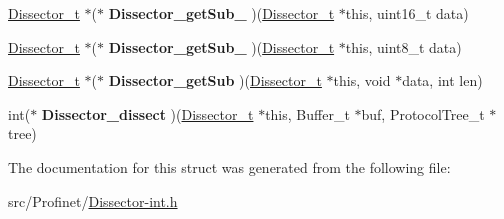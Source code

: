 \begin{DoxyCompactItemize}
\item 
\hypertarget{struct_dissector__ops_acaa1e2ba26e7c3a4f7aa8e35fa35beb9}{}\hyperlink{struct_dissector}{Dissector\+\_\+t} $\ast$($\ast$ {\bfseries Dissector\+\_\+get\+Sub\+\_} )(\hyperlink{struct_dissector}{Dissector\+\_\+t} $\ast$this, uint16\+\_\+t data)\label{struct_dissector__ops_acaa1e2ba26e7c3a4f7aa8e35fa35beb9}

\item 
\hypertarget{struct_dissector__ops_ac821f45c0b8976ed2f0d02ead701ab18}{}\hyperlink{struct_dissector}{Dissector\+\_\+t} $\ast$($\ast$ {\bfseries Dissector\+\_\+get\+Sub\+\_} )(\hyperlink{struct_dissector}{Dissector\+\_\+t} $\ast$this, uint8\+\_\+t data)\label{struct_dissector__ops_ac821f45c0b8976ed2f0d02ead701ab18}

\item 
\hypertarget{struct_dissector__ops_a687bd0733ecbe9b1443fcf846d3acac7}{}\hyperlink{struct_dissector}{Dissector\+\_\+t} $\ast$($\ast$ {\bfseries Dissector\+\_\+get\+Sub} )(\hyperlink{struct_dissector}{Dissector\+\_\+t} $\ast$this, void $\ast$data, int len)\label{struct_dissector__ops_a687bd0733ecbe9b1443fcf846d3acac7}

\item 
\hypertarget{struct_dissector__ops_a6dcacad56d3939148ddd7bca89b7c72b}{}int($\ast$ {\bfseries Dissector\+\_\+dissect} )(\hyperlink{struct_dissector}{Dissector\+\_\+t} $\ast$this, Buffer\+\_\+t $\ast$buf, Protocol\+Tree\+\_\+t $\ast$tree)\label{struct_dissector__ops_a6dcacad56d3939148ddd7bca89b7c72b}

\end{DoxyCompactItemize}


The documentation for this struct was generated from the following file\+:\begin{DoxyCompactItemize}
\item 
src/\+Profinet/\hyperlink{_dissector-int_8h}{Dissector-\/int.\+h}\end{DoxyCompactItemize}
